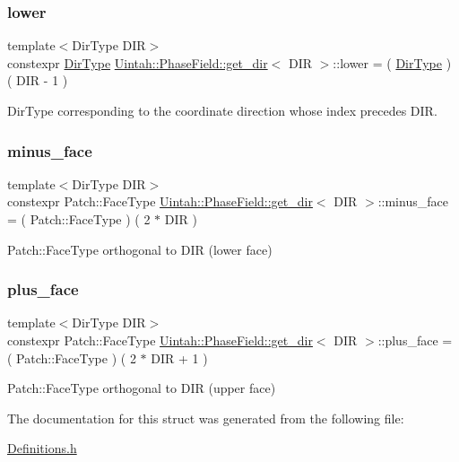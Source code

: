 \subsubsection{\texorpdfstring{lower}{lower}}
{\footnotesize\ttfamily template$<$Dir\+Type D\+IR$>$ \\
constexpr \hyperlink{namespaceUintah_1_1PhaseField_a94555da848596a419ae2c0e32649e1dc}{Dir\+Type} \hyperlink{structUintah_1_1PhaseField_1_1get__dir}{Uintah\+::\+Phase\+Field\+::get\+\_\+dir}$<$ D\+IR $>$\+::lower = ( \hyperlink{namespaceUintah_1_1PhaseField_a94555da848596a419ae2c0e32649e1dc}{Dir\+Type} ) ( D\+IR -\/ 1 )\hspace{0.3cm}{\ttfamily [static]}}



Dir\+Type corresponding to the coordinate direction whose index precedes D\+IR. 

\mbox{\label{structUintah_1_1PhaseField_1_1get__dir_ac1dfe53d61e67038a7784e8d7d1f0b1a}} 
\subsubsection{\texorpdfstring{minus\+\_\+face}{minus\_face}}
{\footnotesize\ttfamily template$<$Dir\+Type D\+IR$>$ \\
constexpr Patch\+::\+Face\+Type \hyperlink{structUintah_1_1PhaseField_1_1get__dir}{Uintah\+::\+Phase\+Field\+::get\+\_\+dir}$<$ D\+IR $>$\+::minus\+\_\+face = ( Patch\+::\+Face\+Type ) ( 2 $\ast$ D\+IR )\hspace{0.3cm}{\ttfamily [static]}}



Patch\+::\+Face\+Type orthogonal to D\+IR (lower face) 

\mbox{\label{structUintah_1_1PhaseField_1_1get__dir_ac765716f79e2b699e4fb5a7434c8612f}} 
\subsubsection{\texorpdfstring{plus\+\_\+face}{plus\_face}}
{\footnotesize\ttfamily template$<$Dir\+Type D\+IR$>$ \\
constexpr Patch\+::\+Face\+Type \hyperlink{structUintah_1_1PhaseField_1_1get__dir}{Uintah\+::\+Phase\+Field\+::get\+\_\+dir}$<$ D\+IR $>$\+::plus\+\_\+face = ( Patch\+::\+Face\+Type ) ( 2 $\ast$ D\+IR + 1 )\hspace{0.3cm}{\ttfamily [static]}}



Patch\+::\+Face\+Type orthogonal to D\+IR (upper face) 



The documentation for this struct was generated from the following file\+:\begin{DoxyCompactItemize}
\item 
\hyperlink{Definitions_8h}{Definitions.\+h}\end{DoxyCompactItemize}
